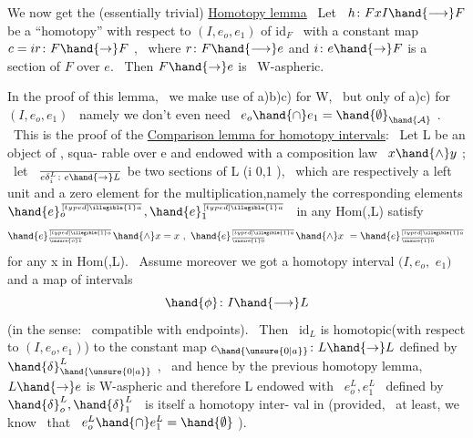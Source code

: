 
We now get the (essentially trivial)
\uline{Homotopy lemma} \ Let \ $h\colon FxI \hand{\longrightarrow} F$ be a ``homotopy'' with respect to $(I,e_o,e_1)$
of $\mathrm{id}_F$ \ with a constant map  $c = ir\colon F \hand{\to} F$ , \ where $r\colon F \hand{\longrightarrow} e$ and 
$i\colon e \hand{\to} F$ is a section of $F$ over $e$. \ Then $F \hand{\to} e$ is \ W-aspheric.

In the proof of this lemma, \ we make use of a)b)c) for W, \ but only
of a)c) for $(I,e_o,e_1)$ \ namely we don't even need \ $e_o \hand{\cap} e_1 = \hand{\emptyset}_{\hand{\mathcal{A}}}$ . \ This is
  the proof of the
\uline{Comparison lemma for homotopy intervals}: \ Let L be an object of  , squa-%
rable over e and endowed with a composition law \ $x\hand{\wedge}y$ ; \ let \ $\over{e}{\delta}_i^L \colon e \hand{\to} L$
be two sections of L (i \hand{\ensuremath{\in\{}}0,1\hand{\ensuremath{\}}} ), \ which are respectively a left unit and a
zero element for the multiplication,namely the corresponding elements
$\hand{e}_o^{\over[typed]{\illegible{1}}{a}},\hand{e}_1^{\over[typed]{\illegible{1}}{a}}$ \ in any Hom(,L) satisfy
\[ \hand{e}_{\over{\unsure{o}}{1}}^{\over[typed]{\illegible{1}}{a}} \hand{\wedge} x = x \ , \ \hand{e}_{\over{\unsure{1}}{0}}^{\over[typed]{\illegible{1}}{a}} \hand{\wedge} x \ = \hand{e}_{\over{\unsure{1}}{0}}^{\over[typed]{\illegible{1}}{a}} \]
for any x in Hom(,L). \ Assume moreover we got a homotopy interval $(I,e_o,$
$e_1)$ and a map of intervals
\[ \hand{\phi}\colon I \hand{\longrightarrow} L \]
(in the sense: \ compatible with endpoints). \ Then \ $\mathrm{id}_L$ is homotopic(with
respect to $(I,e_o,e_1)$) to the constant map $c_{\hand{\unsure{0|a}}}\colon L \hand{\to} L$ defined by $\hand{\delta}^L_{\hand{\unsure{0|a}}}$ , \ and
hence by the previous homotopy lemma, \ $L \hand{\to} e$ is W-aspheric and therefore
 L endowed with \ $e_o^L ,e_1^L$ \ defined by $\hand{\delta}_o^L,\hand{\delta}_1^L$ \ is itself a homotopy inter-%
val in  (provided, \ at least, we know \ that \ $e_o^L \hand{\cap} e_1^L = \hand{\emptyset}$ ).

